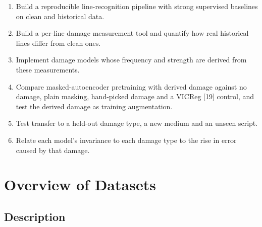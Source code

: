 \documentclass[
  12pt,
  a4paper,
]{report}
\providecommand{\tightlist}{%
  \setlength{\itemsep}{0pt}\setlength{\parskip}{0pt}}
\begin{document}
\begin{enumerate}
\def\labelenumi{\arabic{enumi}.}
\tightlist
\item
  Build a reproducible line-recognition pipeline with strong supervised
  baselines on clean and historical data.
\item
  Build a per-line damage measurement tool and quantify how real
  historical lines differ from clean ones.
\item
  Implement damage models whose frequency and strength are derived from
  these measurements.
\item
  Compare masked-autoencoder pretraining with derived damage against no
  damage, plain masking, hand-picked damage and a VICReg {[}19{]}
  control, and test the derived damage as training augmentation.
\item
  Test transfer to a held-out damage type, a new medium and an unseen
  script.
\item
  Relate each model's invariance to each damage type to the rise in
  error caused by that damage.
\end{enumerate}

\chapter{Overview of Datasets}\label{overview-of-datasets}

\section{Description}\label{description}
\end{document}
